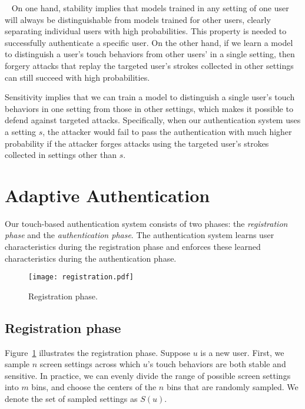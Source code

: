\documentclass{sig-alternate-05-2015}
\newcommand{\myparatight}[1]{\smallskip\noindent{\bf {#1}:}~}
\begin{document}
\myparatight{Implications} On one hand, stability implies that models trained in
any setting of one user will always be distinguishable from models trained for
other users, clearly separating individual users with high probabilities. This
property is needed to successfully authenticate a specific user. On the other
hand,  if we learn a model to distinguish a user's touch behaviors from other
users' in a single setting, then forgery attacks that replay the targeted user's
strokes collected in other settings can still succeed with high probabilities.



Sensitivity implies that we can train a model to distinguish a single user's touch behaviors
in one setting from those in  other settings, which makes it possible to defend against targeted attacks. 
Specifically, when our authentication system uses a setting $s$,  the attacker would fail to pass the authentication
with much higher probability if the attacker forges attacks using the targeted user's strokes collected in settings other than $s$.










\section{Adaptive Authentication}


Our touch-based authentication system consists of two phases: the
\emph{registration phase} and the \emph{authentication phase}. The
authentication system learns user characteristics during the registration phase
and enforces these learned characteristics during the authentication phase.



\begin{figure}[!t]
\centering
\texttt{[image: registration.pdf]}
\caption{Registration phase.  }
\label{registration}
\end{figure}





\subsection{Registration phase}


Figure~\ref{registration} illustrates the registration phase.  Suppose $u$ is a new user.  
First, we sample $n$ screen settings across which $u$'s touch behaviors are both stable and sensitive. In
 practice, we can evenly divide the range of possible screen settings into $m$ bins, and choose the centers of
 the $n$ bins that are randomly sampled.
We denote the set of sampled settings as
$S(u)$.  
\end{document}
